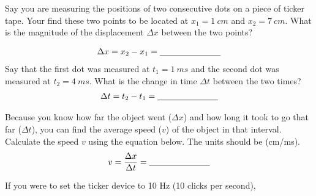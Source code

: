 \begin{questions}

\question[\half] Say you are measuring the positions of two consecutive dots on a piece of ticker tape. Your find these two points to be located at $x_1=\SI{1}{cm}$ and $x_2=\SI{7}{cm}$. What is the magnitude of the displacement $\Delta x$ between the two points?  
\qsp

\begin{align*}
\Delta x = x_2 - x_1 = \underline{\hspace{2.5cm}}
\end{align*}
\newpage
\question[\half] Say that the first dot was measured at $t_1=\SI{1}{ms}$ and the second dot was measured at $t_2=\SI{4}{ms}$. What is the change in time $\Delta t$ between the two times?
\qsp
\begin{align*}
\Delta t = t_2 - t_1 = \underline{\hspace{2.5cm}}
\end{align*}

\question[1] Because you know how far the object went ($\Delta x$) and how long it took to go that far ($\Delta t$), you can find the average speed ($v$) of the object in that interval. Calculate the speed $v$ using the equation below. The units should be (cm/ms). \\[0.5cm]
\begin{align*}
v = \frac{\Delta x}{\Delta t} = \underline{\hspace{2.5cm}}
\end{align*}
\newline


\question[1] If you were to set the ticker device to 10 Hz (10 clicks per second),


\newpage


\end{questions}
